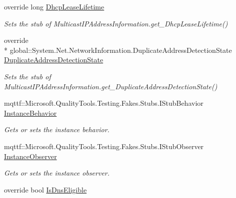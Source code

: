 \begin{DoxyCompactItemize}
override long \hyperlink{class_system_1_1_net_1_1_network_information_1_1_fakes_1_1_stub_multicast_i_p_address_information_a69d5d73a1699d77278794f055295dac6}{Dhcp\-Lease\-Lifetime}
\begin{DoxyCompactList}\small\item\em Sets the stub of Multicast\-I\-P\-Address\-Information.\-get\-\_\-\-Dhcp\-Lease\-Lifetime()\end{DoxyCompactList}\item 
override \\*
global\-::\-System.\-Net.\-Network\-Information.\-Duplicate\-Address\-Detection\-State \hyperlink{class_system_1_1_net_1_1_network_information_1_1_fakes_1_1_stub_multicast_i_p_address_information_aaa7ecf4fd62bd8b2d243a9ad42fa4c45}{Duplicate\-Address\-Detection\-State}
\begin{DoxyCompactList}\small\item\em Sets the stub of Multicast\-I\-P\-Address\-Information.\-get\-\_\-\-Duplicate\-Address\-Detection\-State()\end{DoxyCompactList}\item 
mqttf\-::\-Microsoft.\-Quality\-Tools.\-Testing.\-Fakes.\-Stubs.\-I\-Stub\-Behavior \hyperlink{class_system_1_1_net_1_1_network_information_1_1_fakes_1_1_stub_multicast_i_p_address_information_aaa03823de0da1b84309db32ce141c21e}{Instance\-Behavior}
\begin{DoxyCompactList}\small\item\em Gets or sets the instance behavior.\end{DoxyCompactList}\item 
mqttf\-::\-Microsoft.\-Quality\-Tools.\-Testing.\-Fakes.\-Stubs.\-I\-Stub\-Observer \hyperlink{class_system_1_1_net_1_1_network_information_1_1_fakes_1_1_stub_multicast_i_p_address_information_ad0c5a616af5741786c64853d49b1b710}{Instance\-Observer}
\begin{DoxyCompactList}\small\item\em Gets or sets the instance observer.\end{DoxyCompactList}\item 
override bool \hyperlink{class_system_1_1_net_1_1_network_information_1_1_fakes_1_1_stub_multicast_i_p_address_information_a8be66a4bed7f6372fc3e5913f6cb5384}{Is\-Dns\-Eligible}

\end{DoxyCompactItemize}
